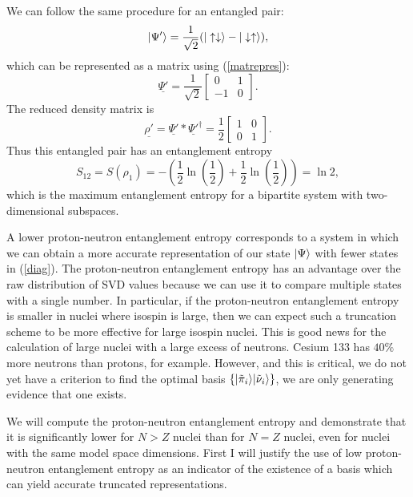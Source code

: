 We can follow the same procedure for an entangled pair:
\begin{equation}\label{maxentangle}
    |\Psi'\rangle=\frac{1}{\sqrt{2}}(|\uparrow\downarrow\rangle-|\downarrow\uparrow\rangle),
\end{equation} 
which can be represented as a matrix using (\ref{matrepres}):
\begin{equation}
    \underline{\Psi'} = \frac{1}{\sqrt{2}}\begin{bmatrix}0&1\\-1&0\end{bmatrix}.
\end{equation}
The reduced density matrix is
\begin{equation}
    \underline{\rho'}=\underline{\Psi'}*\underline{\Psi'}^\dagger=\frac{1}{2}\begin{bmatrix}1&0\\0&1\end{bmatrix}.
\end{equation}
Thus this entangled pair has an entanglement entropy 
\begin{equation}
    S_{12}=S(\rho_1)=-(\frac{1}{2}\ln(\frac{1}{2})+\frac{1}{2}\ln(\frac{1}{2}))=\ln 2,
\end{equation}
which is the maximum entanglement entropy for a bipartite system with two-dimensional subspaces.

A lower proton-neutron entanglement entropy corresponds to a system in which we can obtain a more
accurate representation of our state $|\Psi\rangle$ with fewer states in (\ref{diag}).
The proton-neutron entanglement entropy has an advantage over the raw
distribution of SVD values because we can use it to compare multiple states with a single
number. In particular, if the proton-neutron entanglement entropy is smaller in 
nuclei where isospin is large, then we can expect such a truncation scheme to be more effective
for large isospin nuclei. This is good news for the calculation of large nuclei with a large 
excess of neutrons. Cesium 133 has $40\%$ more neutrons than protons, for example.
However, and this is critical, we do not yet have a criterion to find the optimal basis 
$\{|\tilde{\pi}_i\rangle|\tilde{\nu}_i\rangle\}$, we are only generating evidence
that one exists. 

We will compute the proton-neutron entanglement entropy and demonstrate that it is
significantly lower for $N>Z$ nuclei than for $N=Z$ nuclei, even for nuclei with the
same model space dimensions. First I will justify the use of low proton-neutron 
entanglement entropy as an indicator of the existence of a  basis which can yield
accurate truncated representations. 


